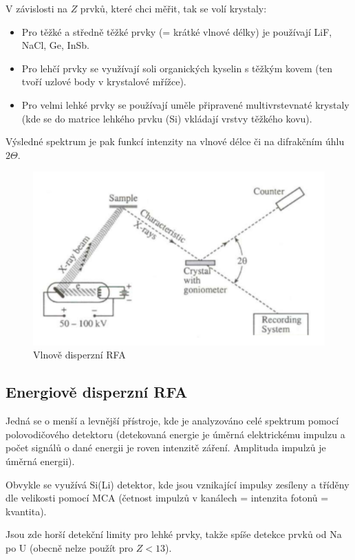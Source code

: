 V závislosti na $Z$ prvků, které chci měřit, tak se volí krystaly:

\begin{itemize}
    \item Pro těžké a středně těžké prvky (= krátké vlnové délky) je používají LiF, NaCl, Ge, InSb.
    \item Pro lehčí prvky se využívají soli organických kyselin s těžkým kovem (ten tvoří uzlové body v krystalové mřížce).
    \item Pro velmi lehké prvky se používají uměle připravené multivrstevnaté krystaly (kde se do matrice lehkého prvku (Si) vkládají vrstvy těžkého kovu).
\end{itemize}

Výsledné spektrum je pak funkcí intenzity na vlnové délce či na difrakčním úhlu $2 \Theta$.

\begin{figure}[H]
    \centering
    \includegraphics[width=0.8\linewidth]{img/Vlnově_disperzní_RFA.png}
    \caption{Vlnově disperzní RFA}
\end{figure}

\subsection{Energiově disperzní RFA}

Jedná se o menší a levnější přístroje, kde je analyzováno celé spektrum pomocí polovodičového detektoru (detekovaná energie je úměrná elektrickému impulzu a počet signálů o dané energii je roven intenzitě záření. Amplituda impulzů je úměrná energii).

Obvykle se využívá Si(Li) detektor, kde jsou vznikající impulsy zesíleny a tříděny dle velikosti pomocí MCA (četnost impulzů v kanálech = intenzita fotonů = kvantita).

Jsou zde horší detekční limity pro lehké prvky, takže spíše detekce prvků od Na po U (obecně nelze použít pro $Z<13$).

